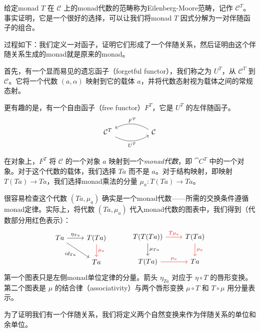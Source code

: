 \documentclass[DaoFP]{subfiles}
\begin{document}
    给定monad $T$ 在 $ \mathcal{C}$ 上的monad代数的范畴称为Eilenberg-Moore范畴，记作 $ \mathcal{C}^T$。事实证明，它是一个很好的选择，可以让我们将monad $T$ 因式分解为一对伴随函子的组合。

    过程如下：我们定义一对函子，证明它们形成了一个伴随关系，然后证明由这个伴随关系生成的monad就是原来的monad。

    首先，有一个显而易见的遗忘函子（forgetful functor），我们称之为 $U^T$，从 $ \mathcal{C}^T$ 到 $ \mathcal{C}$。它将一个代数 $(a, \alpha)$ 映射到它的载体 $a$，并将代数态射视为载体之间的常规态射。

    更有趣的是，有一个自由函子（free functor）$F^T$，它是 $U^T$ 的左伴随函子。
    \[
        \begin{tikzcd}
            \mathcal{C}^T
            \arrow[rr, bend right, "U^T"']
            &&
            \mathcal{C}
            \arrow[ll, bend right, "F^T"']
        \end{tikzcd}
    \]

    在对象上，$F^T$ 将 $ \mathcal{C}$ 的一个对象 $a$ 映射到一个\emph{monad代数}，即 $\cat{C}^T$ 中的一个对象。对于这个代数的载体，我们选择 $T a$ 而不是 $a$。对于结构映射，即映射 $T (T a) \to T a$，我们选择monad乘法的分量 $\mu_a \colon T(T a) \to T a$。

    很容易检查这个代数 $(T a, \mu_a)$ 确实是一个monad代数——所需的交换条件遵循monad定律。实际上，将代数 $(T a, \mu_a)$ 代入monad代数的图表中，我们得到（代数部分用红色表示）：
    \[
        \begin{tikzcd}
            T a
            \arrow[r, "\eta_{T a}"]
            \arrow[dr, "id_{T a}"']
            & T(T a)
            \arrow[d, red, "\mu_a"]
            \\
            & T a
        \end{tikzcd}
        \hspace{30pt}
        \begin{tikzcd}
            T(T(T a))
            \arrow[r, red, "T \mu_a "]
            \arrow[d, "\mu_{T a}"]
            &T(T a)
            \arrow[d, red, "\mu_a"]
            \\
            T (T a)
            \arrow[r, red, "\mu_a"]
            & T a
        \end{tikzcd}
    \]
    第一个图表只是左侧monad单位定律的分量。箭头 $\eta_{T a}$ 对应于 $\eta \circ T$ 的唇形变换。第二个图表是 $\mu$ 的结合律（associativity）与两个唇形变换 $\mu \circ T$ 和 $T \circ \mu$ 用分量表示。

    为了证明我们有一个伴随关系，我们将定义两个自然变换来作为伴随关系的单位和余单位。
\end{document}

